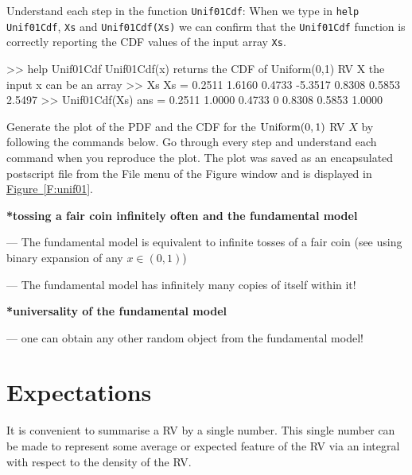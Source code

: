 {\begin{labwork}\label{LW:Unif01Cdf}
Understand each step in the function {\tt Unif01Cdf}:
When we type in {\tt help Unif01Cdf}, {\tt Xs} and {\tt Unif01Cdf(Xs)} we can confirm that the {\tt Unif01Cdf} function is correctly reporting the CDF values of the input array {\tt Xs}.
\begin{VrbM}
>> help Unif01Cdf
  Unif01Cdf(x) returns the CDF of Uniform(0,1) RV X
  the input x can be an array 
>> Xs
Xs =    0.2511    1.6160    0.4733   -5.3517    0.8308    0.5853    2.5497
>> Unif01Cdf(Xs)
ans =    0.2511    1.0000    0.4733         0    0.8308    0.5853    1.0000
\end{VrbM}
\end{labwork}

\begin{labwork}\label{LW:PlotUnif01PdfCdf}
Generate the plot of the PDF and the CDF for the $\mbox{{\rm Uniform}}(0,1)$ RV $X$ by following the commands below.  Go through every step and understand each command when you reproduce the plot.
The plot was saved as an encapsulated postscript file from the File menu of the Figure window and is displayed in \hyperref[F:unif01]{Figure~\ref*{F:unif01}}.
 \end{labwork}
}

{\bf **tossing a fair coin infinitely often and the fundamental model}


--- The fundamental model is equivalent to infinite tosses of a fair coin (see using binary expansion of any $x \in (0,1)$)

--- The fundamental model has infinitely many copies of itself within it!


{\bf **universality of the fundamental model}

--- one can obtain any other random object from the fundamental model!
\newpage


\section{Expectations}\label{S:Expectations}
It is convenient to summarise a RV by a single number.  This single number can be made to represent some average or expected feature of the RV via an integral with respect to the density of the RV.  

